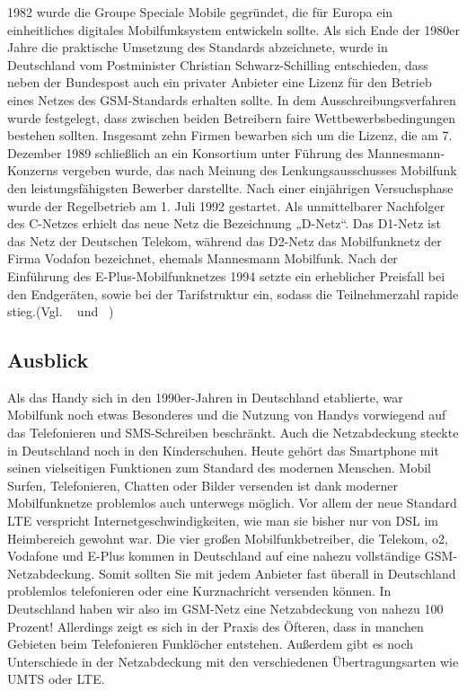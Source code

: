 \begin{multicols}{3}

1982 wurde die Groupe Speciale Mobile gegründet, die für Europa ein einheitliches digitales Mobilfunksystem entwickeln sollte. Als sich Ende der 1980er Jahre die praktische Umsetzung des Standards abzeichnete, wurde in Deutschland vom Postminister Christian Schwarz-Schilling entschieden, dass neben der Bundespost auch ein privater Anbieter eine Lizenz für den Betrieb eines Netzes des GSM-Standards erhalten sollte. In dem Ausschreibungsverfahren wurde festgelegt, dass zwischen beiden Betreibern faire Wettbewerbsbedingungen bestehen sollten. Insgesamt zehn Firmen bewarben sich um die Lizenz, die am 7. Dezember 1989 schließlich an ein Konsortium unter Führung des Mannesmann-Konzerns vergeben wurde, das nach Meinung des Lenkungsausschusses Mobilfunk den leistungsfähigsten Bewerber darstellte.
Nach einer einjährigen Versuchsphase wurde der Regelbetrieb am 1. Juli 1992 gestartet. Als unmittelbarer Nachfolger des C-Netzes erhielt das neue Netz die Bezeichnung „D-Netz“.
Das D1-Netz ist das Netz der Deutschen Telekom, während das D2-Netz das Mobilfunknetz der Firma Vodafon bezeichnet, ehemals Mannesmann Mobilfunk. Nach der Einführung des E-Plus-Mobilfunknetzes 1994 setzte ein erheblicher Preisfall bei den Endgeräten, sowie bei der Tarifstruktur ein, sodass die Teilnehmerzahl rapide stieg.(Vgl. ~\cite{vorlage.3} und ~\cite{vorlage.4})

\subsection*{Ausblick}

Als das Handy sich in den 1990er-Jahren in Deutschland etablierte, war Mobilfunk noch etwas Besonderes und die Nutzung von Handys vorwiegend auf das Telefonieren und SMS-Schreiben beschränkt. Auch die Netzabdeckung steckte in Deutschland noch in den Kinderschuhen. Heute gehört das Smartphone mit seinen vielseitigen Funktionen zum Standard des modernen Menschen. Mobil Surfen, Telefonieren, Chatten oder Bilder versenden ist dank moderner Mobilfunknetze problemlos auch unterwegs möglich. Vor allem der neue Standard LTE verspricht Internetgeschwindigkeiten, wie man sie bisher nur von DSL im Heimbereich gewohnt war.
Die vier großen Mobilfunkbetreiber, die Telekom, o2, Vodafone und E-Plus kommen in Deutschland auf eine nahezu vollständige GSM-Netzabdeckung. Somit sollten Sie mit jedem Anbieter fast überall in Deutschland problemlos telefonieren oder eine Kurznachricht versenden können. In Deutschland haben wir also im GSM-Netz eine Netzabdeckung von nahezu 100 Prozent! Allerdings zeigt es sich in der Praxis des Öfteren, dass in manchen Gebieten beim Telefonieren Funklöcher entstehen. Außerdem gibt es noch Unterschiede in der Netzabdeckung mit den verschiedenen Übertragungsarten wie UMTS oder LTE.


\end{multicols}
